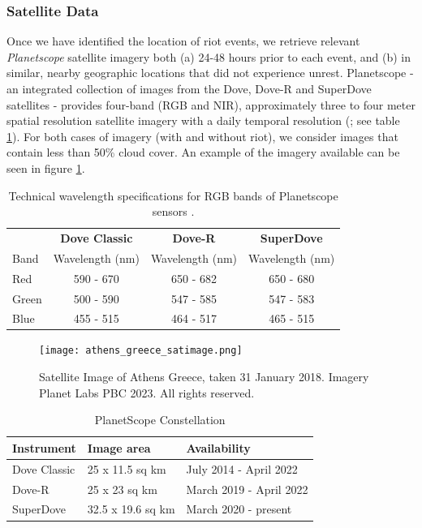 \subsubsection{Satellite Data}
Once we have identified the location of riot events, we retrieve relevant \textit{Planetscope} satellite imagery both (a) 24-48 hours prior to each event, and (b) in similar, nearby geographic locations that did not experience unrest.  Planetscope - an integrated collection of images from the Dove, Dove-R and SuperDove satellites - provides four-band (RGB and NIR), approximately three to four meter spatial resolution satellite imagery with a daily temporal resolution (\cite{planetScope}; see table \ref{tab:planetscope}). For both cases of imagery (with and without riot), we consider images that contain less than 50\% cloud cover.  An example of the imagery available can be seen in figure \ref{fig:athens_baseimage}.  


\begin{table}
    \centering
    \begin{tabular}{|l|c|c|c|}
    \hline
            & \textbf{Dove Classic} & \textbf{Dove-R} & \textbf{SuperDove}\\
         Band  & Wavelength (nm) & Wavelength (nm) & Wavelength (nm) \\
         \hline
         Red   & 590 - 670       & 650 - 682       & 650 - 680\\
         Green & 500 - 590       & 547 - 585       & 547 - 583\\
         Blue  & 455 - 515       & 464 - 517       & 465 - 515\\
         \hline
    \end{tabular}
    \caption{Technical wavelength specifications for RGB bands of Planetscope sensors \citep{planetScope}.  }
    \label{tab:planetscope}
\end{table}

\begin{figure}
    \centering
    \texttt{[image: athens\_greece\_satimage.png]}
    \caption{Satellite Image of Athens Greece, taken 31 January 2018. Imagery \textcopyright Planet Labs PBC 2023. All rights reserved.}
    \label{fig:athens_baseimage}
\end{figure}


\begin{table}[htbp]
    \centering
    \caption{PlanetScope Constellation \citep{planetScope} }
    \begin{tabular}{|l|l|l|}
        \hline
        \textbf{Instrument} & \textbf{Image area} & \textbf{Availability} \\
        \hline
        Dove Classic & 25 x 11.5 sq km & July 2014 - April 2022 \\
        Dove-R & 25 x 23 sq km & March 2019 - April 2022 \\
        SuperDove & 32.5 x 19.6 sq km & March 2020 - present \\

        \hline  
    \end{tabular}
    \label{tab:doves}
\end{table}


